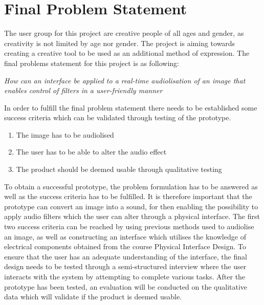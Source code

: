 \chapter{Final Problem Statement}\label{ch:finalproblem}

The user group for this project are creative people of all ages and gender, as creativity is not limited by age nor gender. The project is aiming towards creating a creative tool to be used as an additional method of expression. 
The final problems statement for this project is as following:



\textit{How can an interface be applied to a real-time audiolisation of an image that enables control of filters in a user-friendly manner}



In order to fulfill the final problem statement there needs to be established some success criteria which can be validated through testing of the prototype. 
\begin{enumerate}
\item The image has to be audiolised 
\item The user has to be able to alter the audio effect 
\item The product should be deemed usable through qualitative testing
\end{enumerate}

To obtain a successful prototype, the problem formulation has to be answered as well as the success criteria has to be fulfilled. It is therefore important that the prototype can convert an image into a sound, for then enabling the possibility to apply audio filters which the user can alter through a physical interface. The first two success criteria can be reached by using previous methods used to audiolise an image, as well as constructing an interface which utilises the knowledge of electrical components obtained from the course Physical Interface Design.
To ensure that the user has an adequate understanding of the interface, the final design needs to be tested through a semi-structured interview where the user interacts with the system by attempting to complete various tasks. After the prototype has been tested, an evaluation will be conducted on the qualitative data which will validate if the product is deemed usable.
